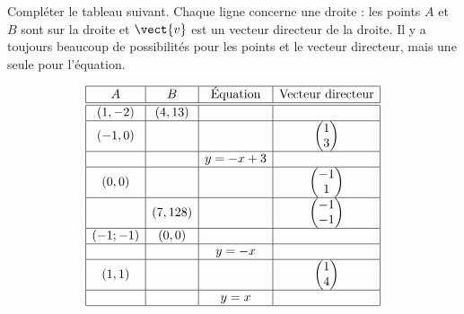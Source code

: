 
\begin{exercice}\label{exosmath-0330}

    Compléter le tableau suivant. Chaque ligne concerne une droite : les points \( A\) et \( B\) sont sur la droite et \( \vect{ v }\) est un vecteur directeur de la droite. Il y a toujours beaucoup de possibilités pour les points et le vecteur directeur, mais une seule pour l'équation.

    \begin{equation*}
        \begin{array}[]{|c|c|c|c|}
            \hline
            A&B&\text{Équation}&\text{Vecteur directeur}\\
            \hline\hline
            (1,-2)&(4,13)&&\\
            \hline
            (-1,0)&&&\begin{pmatrix}
                1    \\ 
                3    
            \end{pmatrix}\\
            \hline
            &&y=-x+3&\\
            \hline
            (0,0)&&&\begin{pmatrix}
                -1    \\ 
                1    
            \end{pmatrix}\\
            \hline
            &(7,128)&&\begin{pmatrix}
                -1    \\ 
                -1    
            \end{pmatrix}\\
            \hline
            (-1;-1)&(0,0)&&\\
            \hline
            &&y=-x&\\
            \hline
            (1,1)&&&\begin{pmatrix}
                1    \\ 
                4    
            \end{pmatrix}\\
            \hline
            &&y=x&\\
            \hline
        \end{array}
    \end{equation*}


\end{exercice}
